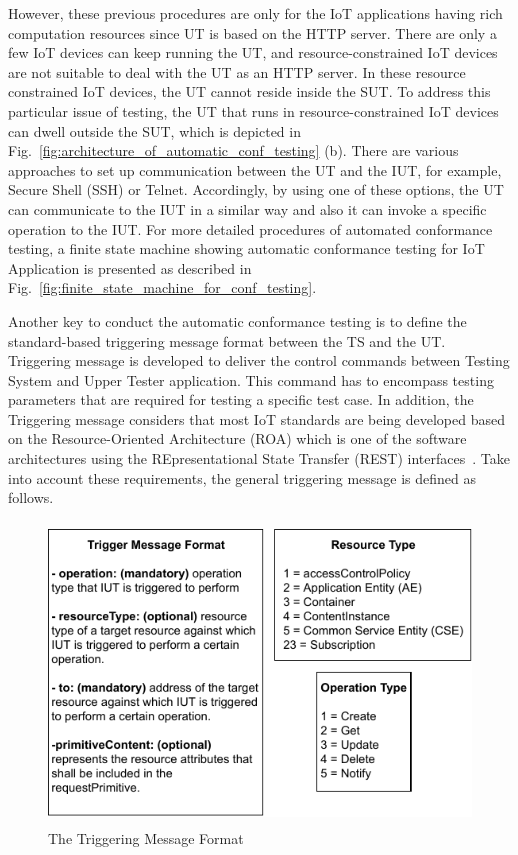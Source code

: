 However, these previous procedures are only for the IoT applications having rich computation resources since UT is based on the HTTP server. There are only a few IoT devices can keep running the UT, and resource-constrained IoT devices are not suitable to deal with the UT as an HTTP server. In these resource constrained IoT devices, the UT cannot reside inside the SUT. To address this particular issue of testing, the UT that runs in resource-constrained IoT devices can dwell outside the SUT, which is depicted in Fig.~\ref{fig:architecture_of_automatic_conf_testing} (b). There are various approaches to set up communication between the UT and the IUT, for example, Secure Shell (SSH) or Telnet. Accordingly, by using one of these options, the UT can communicate to the IUT in a similar way and also it can invoke a specific operation to the IUT. For more detailed procedures of automated conformance testing, a finite state machine showing automatic conformance testing for IoT Application is presented as described in Fig.~\ref{fig:finite_state_machine_for_conf_testing}.

Another key to conduct the automatic conformance testing is to define the standard-based triggering message format between the TS and the UT. Triggering message is developed to deliver the control commands between Testing System and Upper Tester application. This command has to encompass testing parameters that are required for testing a specific test case. In addition, the Triggering message considers that most IoT standards are being developed based on the Resource-Oriented Architecture (ROA) which is one of the software architectures using the REpresentational State Transfer (REST) interfaces~\cite{hong2012resource}. Take into account these requirements, the general triggering message is defined as follows.

\begin{figure}[H]			%
	\centering
	\includegraphics[height=8cm, width=\textwidth]{figures/fig_triggering_message_format.pdf}
    \caption{The Triggering Message Format}
    \label{fig:the_triggering_message_format}
\end{figure}


